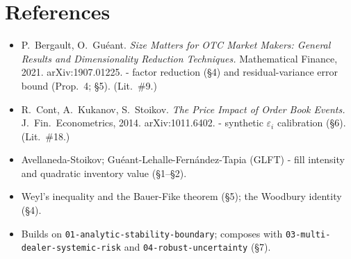 \documentclass[11pt]{article}
\newcommand{\eps}{\varepsilon}
\newcommand{\code}[1]{\texttt{#1}}
\begin{document}
\section*{References}
\begin{itemize}[leftmargin=1.4em]
  \item P.\ Bergault, O.\ Gu\'eant. \emph{Size Matters for OTC Market Makers:
  General Results and Dimensionality Reduction Techniques.} Mathematical Finance,
  2021. arXiv:1907.01225. - factor reduction (\S4) and residual-variance error bound
  (Prop.~4; \S5). (Lit.\ \#9.)
  \item R.\ Cont, A.\ Kukanov, S.\ Stoikov. \emph{The Price Impact of Order Book
  Events.} J.\ Fin.\ Econometrics, 2014. arXiv:1011.6402. - synthetic $\eps_i$
  calibration (\S6). (Lit.\ \#18.)
  \item Avellaneda-Stoikov; Gu\'eant-Lehalle-Fern\'andez-Tapia (GLFT) - fill
  intensity and quadratic inventory value (\S1--\S2).
  \item Weyl's inequality and the Bauer-Fike theorem (\S5); the Woodbury identity
  (\S4).
  \item Builds on \code{01-analytic-stability-boundary}; composes with
  \code{03-multi-dealer-systemic-risk} and \code{04-robust-uncertainty} (\S7).
\end{itemize}
\end{document}

